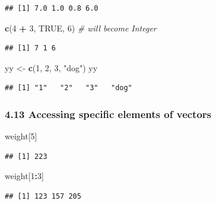 \documentclass[]{article}
\newenvironment{Shaded}{\begin{snugshade}}{\end{snugshade}}
\newcommand{\KeywordTok}[1]{\textcolor[rgb]{0.13,0.29,0.53}{\textbf{#1}}}
\newcommand{\DecValTok}[1]{\textcolor[rgb]{0.00,0.00,0.81}{#1}}
\newcommand{\StringTok}[1]{\textcolor[rgb]{0.31,0.60,0.02}{#1}}
\newcommand{\CommentTok}[1]{\textcolor[rgb]{0.56,0.35,0.01}{\textit{#1}}}
\newcommand{\OtherTok}[1]{\textcolor[rgb]{0.56,0.35,0.01}{#1}}
\newcommand{\OperatorTok}[1]{\textcolor[rgb]{0.81,0.36,0.00}{\textbf{#1}}}
\newcommand{\NormalTok}[1]{#1}
\begin{document}
\begin{verbatim}
## [1] 7.0 1.0 0.8 6.0
\end{verbatim}

\begin{Shaded}
\begin{Highlighting}[]
\KeywordTok{c}\NormalTok{(}\DecValTok{4} \OperatorTok{+}\StringTok{ }\DecValTok{3}\NormalTok{, }\OtherTok{TRUE}\NormalTok{, }\DecValTok{6}\NormalTok{) }\CommentTok{# will become Integer}
\end{Highlighting}
\end{Shaded}

\begin{verbatim}
## [1] 7 1 6
\end{verbatim}

\begin{Shaded}
\begin{Highlighting}[]
\NormalTok{yy <-}\StringTok{ }\KeywordTok{c}\NormalTok{(}\DecValTok{1}\NormalTok{, }\DecValTok{2}\NormalTok{, }\DecValTok{3}\NormalTok{, }\StringTok{"dog"}\NormalTok{)}
\NormalTok{yy}
\end{Highlighting}
\end{Shaded}

\begin{verbatim}
## [1] "1"   "2"   "3"   "dog"
\end{verbatim}

\subsubsection{4.13 Accessing specific elements of
vectors}\label{accessing-specific-elements-of-vectors}

\begin{Shaded}
\begin{Highlighting}[]
\NormalTok{weight[}\DecValTok{5}\NormalTok{]}
\end{Highlighting}
\end{Shaded}

\begin{verbatim}
## [1] 223
\end{verbatim}

\begin{Shaded}
\begin{Highlighting}[]
\NormalTok{weight[}\DecValTok{1}\OperatorTok{:}\DecValTok{3}\NormalTok{]}
\end{Highlighting}
\end{Shaded}

\begin{verbatim}
## [1] 123 157 205
\end{verbatim}
\end{document}
